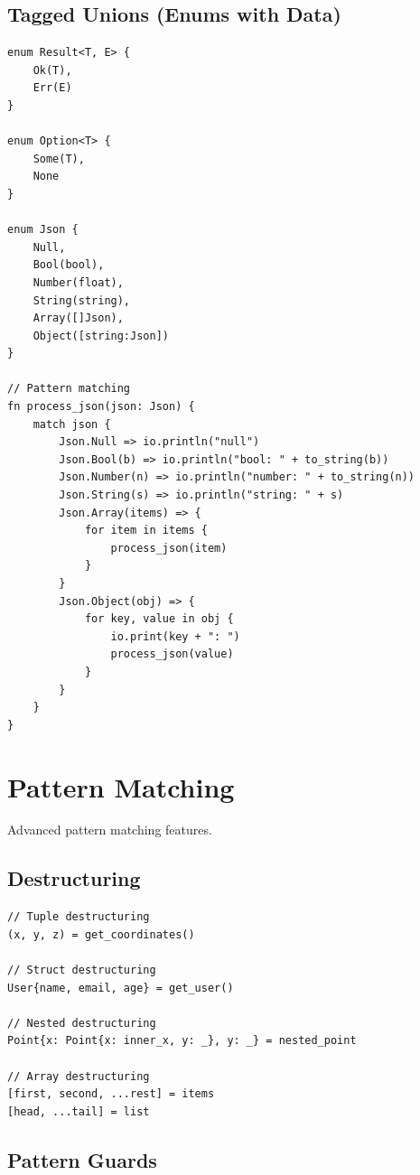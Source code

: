 \subsection{Tagged Unions (Enums with Data)}

\begin{lstlisting}
enum Result<T, E> {
    Ok(T),
    Err(E)
}

enum Option<T> {
    Some(T),
    None
}

enum Json {
    Null,
    Bool(bool),
    Number(float),
    String(string),
    Array([]Json),
    Object([string:Json])
}

// Pattern matching
fn process_json(json: Json) {
    match json {
        Json.Null => io.println("null")
        Json.Bool(b) => io.println("bool: " + to_string(b))
        Json.Number(n) => io.println("number: " + to_string(n))
        Json.String(s) => io.println("string: " + s)
        Json.Array(items) => {
            for item in items {
                process_json(item)
            }
        }
        Json.Object(obj) => {
            for key, value in obj {
                io.print(key + ": ")
                process_json(value)
            }
        }
    }
}
\end{lstlisting}

\section{Pattern Matching}

Advanced pattern matching features.

\subsection{Destructuring}

\begin{lstlisting}
// Tuple destructuring
(x, y, z) = get_coordinates()

// Struct destructuring
User{name, email, age} = get_user()

// Nested destructuring
Point{x: Point{x: inner_x, y: _}, y: _} = nested_point

// Array destructuring
[first, second, ...rest] = items
[head, ...tail] = list
\end{lstlisting}

\subsection{Pattern Guards}

